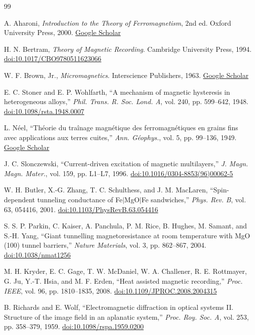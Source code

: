 \documentclass[11pt,a4paper,twoside]{article}
\theoremstyle{definition}
\theoremstyle{plain}
\theoremstyle{remark}
\begin{document}
\begin{thebibliography}{99}

A. Aharoni, \textit{Introduction to the Theory of Ferromagnetism}, 2nd ed.
Oxford University Press, 2000.
\href{https://scholar.google.com/scholar?q=Introduction+to+the+Theory+of+Ferromagnetism+Aharoni}{Google Scholar}

H. N. Bertram, \textit{Theory of Magnetic Recording}.
Cambridge University Press, 1994.
\href{https://doi.org/10.1017/CBO9780511623066}{doi:10.1017/CBO9780511623066}

W. F. Brown, Jr., \textit{Micromagnetics}.
Interscience Publishers, 1963.
\href{https://scholar.google.com/scholar?q=Micromagnetics+Brown+1963}{Google Scholar}

E. C. Stoner and E. P. Wohlfarth,
``A mechanism of magnetic hysteresis in heterogeneous alloys,''
\textit{Phil. Trans. R. Soc. Lond. A}, vol. 240, pp. 599--642, 1948.
\href{https://doi.org/10.1098/rsta.1948.0007}{doi:10.1098/rsta.1948.0007}

L. N\'{e}el,
``Th\'{e}orie du tra\^{i}nage magn\'{e}tique des ferromagn\'{e}tiques en grains fins avec applications aux terres cuites,''
\textit{Ann. G\'{e}ophys.}, vol. 5, pp. 99--136, 1949.
\href{https://scholar.google.com/scholar?q=Neel+trainage+magnetique+ferromagnetiques+grains+fins+1949}{Google Scholar}

J. C. Slonczewski,
``Current-driven excitation of magnetic multilayers,''
\textit{J. Magn. Magn. Mater.}, vol. 159, pp. L1--L7, 1996.
\href{https://doi.org/10.1016/0304-8853(96)00062-5}{doi:10.1016/0304-8853(96)00062-5}

W. H. Butler, X.-G. Zhang, T. C. Schulthess, and J. M. MacLaren,
``Spin-dependent tunneling conductance of Fe$|$MgO$|$Fe sandwiches,''
\textit{Phys. Rev. B}, vol. 63, 054416, 2001.
\href{https://doi.org/10.1103/PhysRevB.63.054416}{doi:10.1103/PhysRevB.63.054416}

S. S. P. Parkin, C. Kaiser, A. Panchula, P. M. Rice, B. Hughes, M. Samant, and S.-H. Yang,
``Giant tunnelling magnetoresistance at room temperature with MgO (100) tunnel barriers,''
\textit{Nature Materials}, vol. 3, pp. 862--867, 2004.
\href{https://doi.org/10.1038/nmat1256}{doi:10.1038/nmat1256}

M. H. Kryder, E. C. Gage, T. W. McDaniel, W. A. Challener, R. E. Rottmayer, G. Ju, Y.-T. Hsia, and M. F. Erden,
``Heat assisted magnetic recording,''
\textit{Proc. IEEE}, vol. 96, pp. 1810--1835, 2008.
\href{https://doi.org/10.1109/JPROC.2008.2004315}{doi:10.1109/JPROC.2008.2004315}

B. Richards and E. Wolf,
``Electromagnetic diffraction in optical systems II. Structure of the image field in an aplanatic system,''
\textit{Proc. Roy. Soc. A}, vol. 253, pp. 358--379, 1959.
\href{https://doi.org/10.1098/rspa.1959.0200}{doi:10.1098/rspa.1959.0200}

\end{thebibliography}
\end{document}
